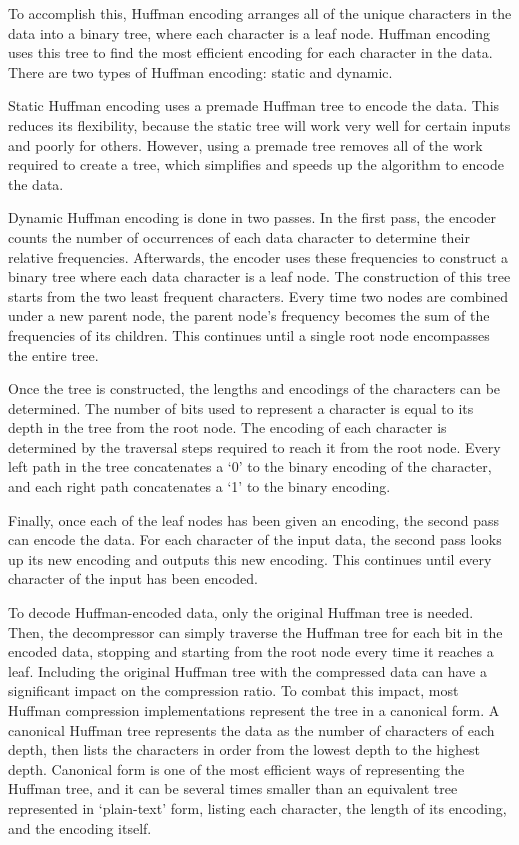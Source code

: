 \documentclass[doublespace,nopageskip]{VTthesis}
\begin{document}
To accomplish this, Huffman encoding arranges all of the unique characters in the data into a binary tree, where each character is a leaf node. Huffman encoding uses this tree to find the most efficient encoding for each character in the data. There are two types of Huffman encoding: static and dynamic.

Static Huffman encoding uses a premade Huffman tree to encode the data. This reduces its flexibility, because the static tree will work very well for certain inputs and poorly for others. However, using a premade tree removes all of the work required to create a tree, which simplifies and speeds up the algorithm to encode the data.

Dynamic Huffman encoding is done in two passes. In the first pass, the encoder counts the number of occurrences of each data character to determine their relative frequencies. Afterwards, the encoder uses these frequencies to construct a binary tree where each data character is a leaf node. The construction of this tree starts from the two least frequent characters. Every time two nodes are combined under a new parent node, the parent node's frequency becomes the sum of the frequencies of its children. This continues until a single root node encompasses the entire tree.

Once the tree is constructed, the lengths and encodings of the characters can be determined. The number of bits used to represent a character is equal to its depth in the tree from the root node. The encoding of each character is determined by the traversal steps required to reach it from the root node. Every left path in the tree concatenates a `0' to the binary encoding of the character, and each right path concatenates a `1' to the binary encoding.

Finally, once each of the leaf nodes has been given an encoding, the second pass can encode the data. For each character of the input data, the second pass looks up its new encoding and outputs this new encoding. This continues until every character of the input has been encoded.

To decode Huffman-encoded data, only the original Huffman tree is needed. Then, the decompressor can simply traverse the Huffman tree for each bit in the encoded data, stopping and starting from the root node every time it reaches a leaf. Including the original Huffman tree with the compressed data can have a significant impact on the compression ratio. To combat this impact, most Huffman compression implementations represent the tree in a canonical form. A canonical Huffman tree represents the data as the number of characters of each depth, then lists the characters in order from the lowest depth to the highest depth. Canonical form is one of the most efficient ways of representing the Huffman tree, and it can be several times smaller than an equivalent tree represented in `plain-text' form, listing each character, the length of its encoding, and the encoding itself.
\end{document}
